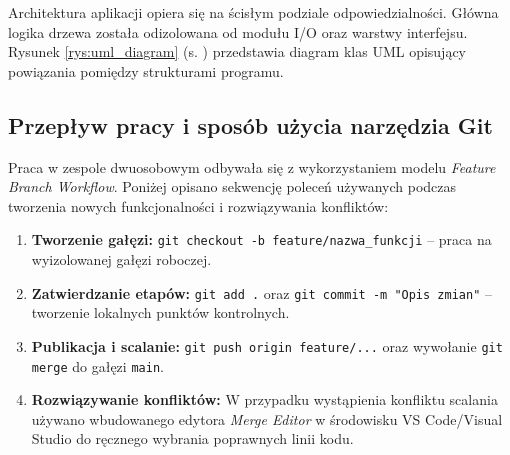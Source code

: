 \hspace{0.60cm}
Architektura aplikacji opiera się na ścisłym podziale odpowiedzialności. Główna logika drzewa została odizolowana od modułu I/O oraz warstwy interfejsu. Rysunek \ref{rys:uml_diagram} (s. \pageref{rys:uml_diagram}) przedstawia diagram klas UML opisujący powiązania pomiędzy strukturami programu.


\subsection{Przepływ pracy i sposób użycia narzędzia Git}

\hspace{0.60cm}
Praca w zespole dwuosobowym odbywała się z wykorzystaniem modelu \textit{Feature Branch Workflow}. Poniżej opisano sekwencję poleceń używanych podczas tworzenia nowych funkcjonalności i rozwiązywania konfliktów:

\begin{enumerate}
    \item \textbf{Tworzenie gałęzi:} \texttt{git checkout -b feature/nazwa\_funkcji} -- praca na wyizolowanej gałęzi roboczej.
    \item \textbf{Zatwierdzanie etapów:} \texttt{git add .} oraz \texttt{git commit -m "Opis zmian"} -- tworzenie lokalnych punktów kontrolnych.
    \item \textbf{Publikacja i scalanie:} \texttt{git push origin feature/...} oraz wywołanie \texttt{git merge} do gałęzi \texttt{main}.
    \item \textbf{Rozwiązywanie konfliktów:} W przypadku wystąpienia konfliktu scalania używano wbudowanego edytora \textit{Merge Editor} w środowisku VS Code/Visual Studio do ręcznego wybrania poprawnych linii kodu.
\end{enumerate}